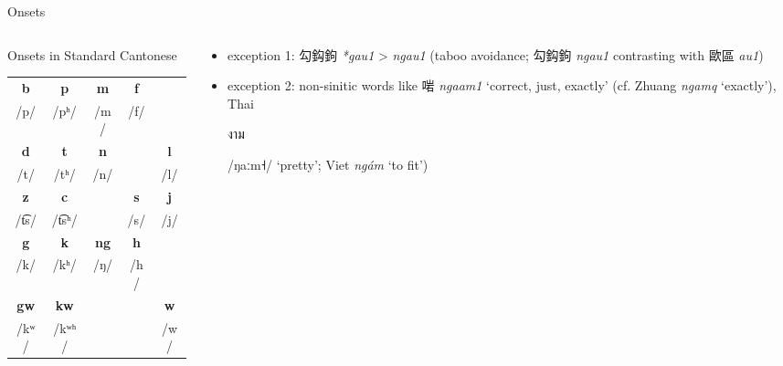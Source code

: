 \documentclass{beamer}
\begin{document}
\begin{frame}[fragile]{Onsets}

\begin{columns}
    \begin{column}{0.5\textwidth}
        Onsets in Standard Cantonese\\
        \bigskip
        \begin{tabular}{c c c c c}
            \hline
            \textbf{b} & \textbf{p} & \textbf{m} & \textbf{f} & \\ 
            /p/ & /pʰ/ & /m/ & /f/ & \\ \hline
            \textbf{d} & \textbf{t} & \textbf{n} & & \textbf{l} \\
            /t/ & /tʰ/ & /n/ & & /l/ \\ \hline
            \textbf{z} & \textbf{c} & & \textbf{s} & \textbf{j} \\
            /t͡s/ & /t͡sʰ/ & & /s/ & /j/ \\ \hline
            \textbf{g} & \textbf{k} & \textbf{ng} & \textbf{h} & \\
            /k/ & /kʰ/ & /ŋ/ & /h/ & \\ \hline
            \textbf{gw} & \textbf{kw} & & & \textbf{w} \\
            /kʷ/ & /kʷʰ/ & & & /w/ \\ \hline
        \end{tabular}
    \end{column}
    \begin{column}{0.5\textwidth} 
        \begin{itemize}
            \item exception 1: 勾鈎鉤 \emph{*gau1} > \emph{ngau1} (taboo avoidance; 勾鈎鉤 \emph{ngau1} contrasting with 歐區 \emph{au1}) 
            \item exception 2: non-sinitic words like 啱 \emph{ngaam1} \enquote*{correct, just, exactly} (cf. Zhuang \emph{ngamq} \enquote*{exactly}), Thai \begin{thai}งาม\end{thai} /ŋaːm˧/ \enquote*{pretty}; Viet \emph{ngám} \enquote*{to fit}) 
        \end{itemize}
    \end{column}
\end{columns}

\end{frame}
\end{document}
